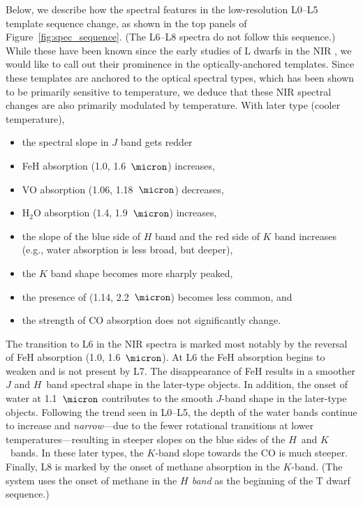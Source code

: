 \documentclass[12pt,preprint]{aastex}
\begin{document}
Below, we describe how the spectral features in the low-resolution L0--L5 template sequence change, as shown in the top panels of Figure~\ref{fig:spec_sequence}. (The L6--L8 spectra do not follow this sequence.)
While these have been known since the early studies of L dwarfs in the NIR \citep{Testi01,Reid01_NIR,Geballe02}, we would like to call out their prominence in the optically-anchored templates.
Since these templates are anchored to the optical spectral types, which has been shown to be primarily sensitive to temperature, we deduce that these NIR spectral changes are also primarily modulated by temperature.
With later type (cooler temperature), 
\begin{itemize}
\item the spectral slope in $J$ band gets redder 
\item FeH absorption (1.0, 1.6~$\micron$) increases,
\item VO absorption (1.06, 1.18~$\micron$) decreases,
\item H$_2$O absorption (1.4, 1.9~$\micron$) increases,
\item the slope of the blue side of $H$ band and the red side of $K$ band increases (e.g., water absorption is less broad, but deeper), 
\item the $K$ band shape becomes more sharply peaked,
\item the presence of  (1.14, 2.2~$\micron$) becomes less common, and
\item the strength of CO absorption does not significantly change.
\end{itemize}

The transition to L6 in the NIR spectra is marked most notably by the reversal of FeH absorption (1.0, 1.6~$\micron$). 
At L6 the FeH absorption begins to weaken and is not present by L7. 
The disappearance of FeH results in a smoother $J$ and $H$~band spectral shape in the later-type objects. In addition, the onset of water at 1.1~$\micron$ contributes to the smooth $J$-band shape in the later-type objects. Following the trend seen in L0--L5, the depth of the water bands continue to increase and \emph{narrow}---due to the fewer rotational transitions at lower temperatures---resulting in steeper slopes on the blue sides of the $H$~and $K$~bands. 
In these later types, the $K$-band slope towards the CO is much steeper. 
Finally, L8 is marked by the onset of methane absorption in the $K$-band. 
(The \citet{Geballe02} system uses the onset of methane in the \emph{$H$ band} as the beginning of the T dwarf sequence.) 
\end{document}
